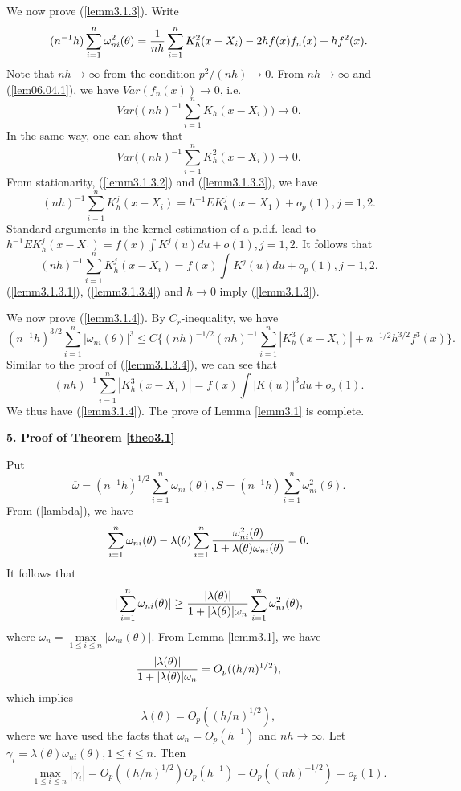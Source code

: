 \documentclass[12pt]{article}
\def\be{\begin{equation}}
\def\ee{\end{equation}}
\begin{document}
We now prove (\ref{lemm3.1.3}). Write
\be
 (n^{-1}h)  \sum^{n}_{i=1}\omega^2_{ni}(\theta)={1\over nh}\sum^n_{i=1}K^2_h(x-X_i)-2hf(x)f_n(x)+hf^2(x). \label{lemm3.1.3.1}
\ee
Note that $nh\to \infty$ from the condition $p^2/(nh)\to 0$. From $nh\to \infty$ and (\ref{lem06.04.1}), we have $Var(f_n(x))\to 0$, i.e.
\be
Var \biggl ( (nh)^{-1}\sum^n_{i=1}K_h(x-X_i) \biggr )\to 0. \label{lemm3.1.3.2}
\ee
In the same way, one can show that
\be
Var \biggl ( (nh)^{-1}\sum^n_{i=1}K^2_h(x-X_i) \biggr )\to 0. \label{lemm3.1.3.3}
\ee
From stationarity, (\ref{lemm3.1.3.2}) and  (\ref{lemm3.1.3.3}), we have
\[
 (nh)^{-1}\sum^n_{i=1}K^j_h(x-X_i)=h^{-1}EK^j_h(x-X_1)+o_p(1), j=1, 2. \label{lemm3.1.3.4}
\]
Standard arguments in the kernel estimation of a p.d.f. lead to $h^{-1}EK^j_h(x-X_1)=f(x)\int K^j(u)du+o(1), j=1,  2$. It follows that
\be
 (nh)^{-1}\sum^n_{i=1}K^j_h(x-X_i)=f(x)\int K^j(u)du+o_p(1), j=1, 2. \label{lemm3.1.3.4}
\ee
(\ref{lemm3.1.3.1}), (\ref{lemm3.1.3.4}) and $h\to 0$ imply (\ref{lemm3.1.3}).

We now prove (\ref{lemm3.1.4}). By $C_r$-inequality, we have
\[
(n^{-1}h)^{3/2}\sum^{n}_{i=1}|\omega_{ni}(\theta)|^3\leq C\{(nh)^{-1/2}(nh)^{-1}\sum^{n}_{i=1}|K^3_h(x-X_i)|+n^{-1/2}h^{3/2}f^3(x)\}.
\]
Similar to the proof of (\ref{lemm3.1.3.4}), we can see that
\[
(nh)^{-1}\sum^{n}_{i=1}|K^3_h(x-X_i)|=f(x)\int |K(u)|^3du+o_p(1).
\]
We thus have (\ref{lemm3.1.4}). The prove of Lemma \ref{lemm3.1} is complete.

\bigskip
\setcounter{section}{5}
\setcounter{equation}{0}
 \noindent
{\bf 5. Proof of Theorem \ref{theo3.1} }
\bigskip

Put
\[
\overline{\omega}=(n^{-1}h)^{1/2}\sum_{i=1}^{n}
\omega_{ni}(\theta),
S=(n^{-1}h)\sum_{i=1}^{n}\omega_{ni}^2(\theta).
\]
From (\ref{lambda}), we have
\[
\sum_{i=1}^{n}\omega_{ni}(\theta)-\lambda(\theta)\sum_{i=1}^{n}
{\omega_{ni}^2(\theta)\over 1+\lambda(\theta)
\omega_{ni}(\theta)}=0.
\]
It follows that
\be
|\sum_{i=1}^{n}\omega_{ni}(\theta)|\geq
{|\lambda(\theta)|\over 1+|\lambda(\theta)|
\omega_{n}}\sum_{i=1}^{n}\omega_{ni}^2(\theta),
\label{theo3.1.10}
\ee
where $\omega_{n}=\max\limits_{1\leq i \leq n} |\omega_{ni}(\theta)|$. From Lemma \ref{lemm3.1}, we have
\[
{|\lambda(\theta)|\over 1+|\lambda(\theta)| \omega_{n}}=O_p((h/n)^{1/2}),
\]
which implies
\be
\lambda(\theta)=O_p((h/n)^{1/2}), \label{proof3.1.1}
\ee
where we have used the facts that $\omega_{n}=O_p(h^{-1})$ and $nh\to \infty$. Let $\gamma_i=\lambda(\theta)
\omega_{ni}(\theta), 1\leq i\leq n$.
Then
\be
\max_{1\leq i \leq
n}|\gamma_i|=O_p((h/n)^{1/2})O_p(h^{-1})=O_p((nh)^{-1/2})=o_p(1). \label{proof3.1.2}
 \ee
\end{document}
